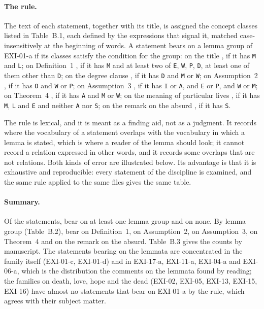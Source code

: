 \paragraph{The rule.} The text of each statement, together with its title, is assigned the concept classes listed in Table~B.1, each defined by the expressions that signal it, matched case-insensitively at the beginning of words. A statement bears on a lemma group of EXI-01-a if its classes satisfy the condition for the group: on the title , if it has \texttt{M} and \texttt{L}; on Definition~1 , if it has \texttt{M} and at least two of \texttt{E}, \texttt{W}, \texttt{P}, \texttt{D}, at least one of them other than \texttt{D}; on the degree clause , if it has \texttt{D} and \texttt{M} or \texttt{W}; on Assumption~2 , if it has \texttt{O} and \texttt{W} or \texttt{P}; on Assumption~3 , if it has \texttt{I} or \texttt{A}, and \texttt{E} or \texttt{P}, and \texttt{W} or \texttt{M}; on Theorem~4 , if it has \texttt{A} and \texttt{M} or \texttt{W}; on the meaning of particular lives , if it has \texttt{M}, \texttt{L} and \texttt{E} and neither \texttt{A} nor \texttt{S}; on the remark on the absurd , if it has \texttt{S}.

The rule is lexical, and it is meant as a finding aid, not as a judgment. It records where the vocabulary of a statement overlaps with the vocabulary in which a lemma is stated, which is where a reader of the lemma should look; it cannot record a relation expressed in other words, and it records some overlaps that are not relations. Both kinds of error are illustrated below. Its advantage is that it is exhaustive and reproducible: every statement of the discipline is examined, and the same rule applied to the same files gives the same table.

\paragraph{Summary.} Of the \cnStatements{} statements, \cnBearing{} bear on at least one lemma group and \cnNotBearing{} on none. By lemma group (Table~B.2), \cnDefOne{} bear on Definition~1, \cnAssTwo{} on Assumption~2, \cnAssThree{} on Assumption~3, \cnThmFour{} on Theorem~4 and \cnAbsurd{} on the remark on the absurd. Table~B.3 gives the counts by manuscript. The statements bearing on the lemmata are concentrated in the family itself (EXI-01-c, EXI-01-d) and in EXI-17-a, EXI-11-a, EXI-04-a and EXI-06-a, which is the distribution the comments on the lemmata found by reading; the families on death, love, hope and the dead (EXI-02, EXI-05, EXI-13, EXI-15, EXI-16) have almost no statements that bear on EXI-01-a by the rule, which agrees with their subject matter.

